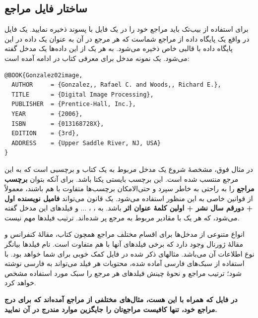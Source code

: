 \subsection{ساختار فایل مراجع}\label{app:bibref}
برای استفاده از بیب‌تک باید مراجع خود را در یک فایل با پسوند  ذخیره نمایید. یک فایل  در واقع یک پایگاه داده از مراجع%
شماست که هر مرجع در آن به عنوان یک داده در این پایگاه داده
با قالبی خاص ذخیره می‌شود. به هر یک از این داده‌ها یک مدخل%
گفته می‌شود. یک نمونه مدخل برای معرفی کتاب  در ادامه آمده است:

\singlespacing
\begin{LTR}
\begin{verbatim}
@BOOK{Gonzalez02image,
  AUTHOR     = {Gonzalez,, Rafael C. and Woods,, Richard E.},
  TITLE      = {Digital Image Processing},
  PUBLISHER  = {Prentice-Hall, Inc.},
  YEAR       = {2006},
  ISBN       = {013168728X},
  EDITION    = {3rd},
  ADDRESS    = {Upper Saddle River, NJ, USA}
}
\end{verbatim}
\end{LTR}
\doublespacing

در مثال فوق،  مشخصهٔ شروع یک مدخل مربوط به یک کتاب و  برچسبی است که به این مرجع منتسب شده است.
 این برچسب بایستی یکتا باشد. برای آنکه بتوان
\textbf{برچسب مراجع}
 را به راحتی به خاطر سپرد و حتی‌الامکان برچسب‌ها متفاوت با هم باشند، معمولاً از قوانین خاصی به این منظور استفاده می‌شود. یک قانون می‌تواند
\textbf{فامیل نویسنده اول + دورقم سال نشر + اولین کلمهٔ عنوان اثر}
باشد. به
، ، $\dots$ و 
فیلدهای این مدخل گفته می‌شود، که هر یک با مقادیر مربوط به مرجع پر شده‌اند. ترتیب فیلدها مهم نیست. 

انواع متنوعی از مدخل‌ها برای اقسام مختلف مراجع همچون کتاب، مقالهٔ کنفرانس و مقالهٔ ژورنال وجود دارد که برخی فیلدهای آنها با هم متفاوت است. 
نام فیلدها بیانگر نوع اطلاعات آن می‌باشد. مثالهای ذکر شده در فایل  کمک خوبی برای شما خواهد بود. 
با استفاده از سبک‌های فارسی آماده شده، محتویات هر فیلد می‌تواند به فارسی نوشته شود؛ ترتیب مراجع و نحوهٔ چینش فیلدهای هر مرجع را سبک مورد استفاده  مشخص خواهد کرد.

\textbf{در فایل 
 که همراه با این \پ هست، مثال‌های مختلفی از مراجع آمده‌اند که برای درج مراجع خود، تنها کافیست مراجع‌تان را جایگزین موارد مندرج در آن نمایید.
}

